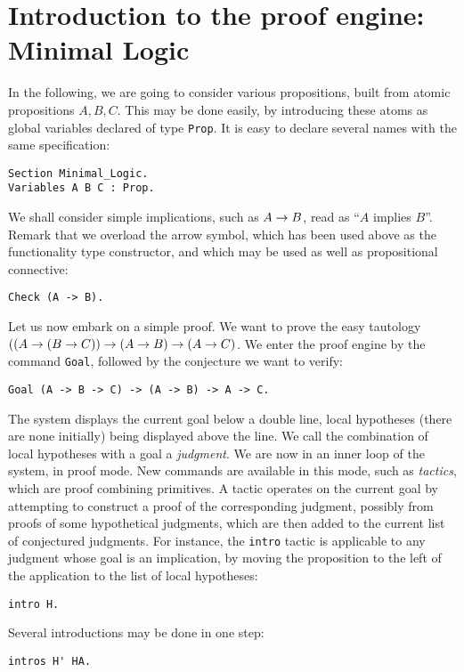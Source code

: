 \documentclass{book}
\begin{document}
\section{Introduction to the proof engine: Minimal Logic}

In the following, we are going to consider various propositions, built
from atomic propositions $A, B, C$. This may be done easily, by
introducing these atoms as global variables declared of type \verb:Prop:.
It is easy to declare several names with the same specification:
\begin{lstlisting}
Section Minimal_Logic.
Variables A B C : Prop.
\end{lstlisting}

We shall consider simple implications, such as $A\rightarrow B$, read as 
``$A$ implies $B$''. Remark that we overload the arrow symbol, which
has been used above as the functionality type constructor, and which
may be used as well as propositional connective:
\begin{lstlisting}
Check (A -> B).
\end{lstlisting}

Let us now embark on a simple proof. We want to prove the easy tautology
$((A\rightarrow (B\rightarrow C))\rightarrow (A\rightarrow B)\rightarrow (A\rightarrow C)$. 
We enter the proof engine by the command
\verb:Goal:, followed by the conjecture we want to verify:
\begin{lstlisting}
Goal (A -> B -> C) -> (A -> B) -> A -> C.
\end{lstlisting}

The system displays the current goal below a double line, local hypotheses
(there are none initially) being displayed above the line. We call 
the combination of local hypotheses with a goal a {\sl judgment}.
We are now in an inner 
loop of the system, in proof mode. 
New commands are available in this
mode, such as {\sl tactics}, which are proof combining primitives.
A tactic operates on the current goal by attempting to construct a proof
of the corresponding judgment, possibly from proofs of some
hypothetical judgments, which are then added to the current
list of conjectured judgments.
For instance, the \verb:intro: tactic is applicable to any judgment
whose goal is an implication, by moving the proposition to the left
of the application to the list of local hypotheses:
\begin{lstlisting}
intro H.
\end{lstlisting}

Several introductions may be done in one step:
\begin{lstlisting}
intros H' HA.
\end{lstlisting}
\end{document}
